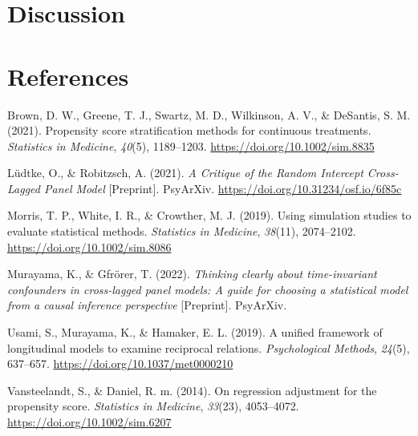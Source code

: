 \documentclass[
]{interact}
\newlength{\cslhangindent}
\newlength{\cslentryspacingunit} %
\newenvironment{CSLReferences}[2] %
 {%
  \setlength{\parindent}{0pt}
  \ifodd #1
  \let\oldpar\par
  \def\par{\hangindent=\cslhangindent\oldpar}
  \fi
  \setlength{\parskip}{#2\cslentryspacingunit}
 }%
 {}
\begin{document}
\hypertarget{discussion}{%
\section{Discussion}\label{discussion}}

\newpage{}

\hypertarget{references}{%
\section*{References}\label{references}}

\hypertarget{refs}{}
\begin{CSLReferences}{1}{0}
\leavevmode{}%
Brown, D. W., Greene, T. J., Swartz, M. D., Wilkinson, A. V., \&
DeSantis, S. M. (2021). Propensity score stratification methods for
continuous treatments. \emph{Statistics in Medicine}, \emph{40}(5),
1189--1203. \url{https://doi.org/10.1002/sim.8835}

\leavevmode{}%
Lüdtke, O., \& Robitzsch, A. (2021). \emph{A {Critique} of the {Random
Intercept Cross-Lagged Panel Model}} {[}Preprint{]}. {PsyArXiv}.
\url{https://doi.org/10.31234/osf.io/6f85c}

\leavevmode{}%
Morris, T. P., White, I. R., \& Crowther, M. J. (2019). Using simulation
studies to evaluate statistical methods. \emph{Statistics in Medicine},
\emph{38}(11), 2074--2102. \url{https://doi.org/10.1002/sim.8086}

\leavevmode{}%
Murayama, K., \& Gfrörer, T. (2022). \emph{Thinking clearly about
time-invariant confounders in cross-lagged panel models: {A} guide for
choosing a statistical model from a causal inference perspective}
{[}Preprint{]}. {PsyArXiv}.

\leavevmode{}%
Usami, S., Murayama, K., \& Hamaker, E. L. (2019). A unified framework
of longitudinal models to examine reciprocal relations.
\emph{Psychological Methods}, \emph{24}(5), 637--657.
\url{https://doi.org/10.1037/met0000210}

\leavevmode{}%
Vansteelandt, S., \& Daniel, R. m. (2014). On regression adjustment for
the propensity score. \emph{Statistics in Medicine}, \emph{33}(23),
4053--4072. \url{https://doi.org/10.1002/sim.6207}

\end{CSLReferences}
\end{document}
